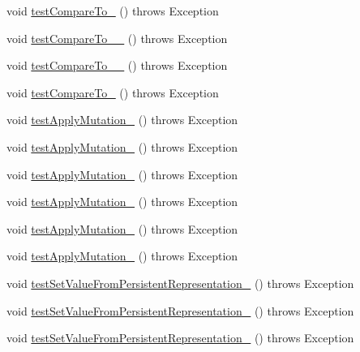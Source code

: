 \begin{DoxyCompactItemize}
void \hyperlink{classorg_1_1jgap_1_1impl_1_1_fixed_binary_gene_test_a05ec3eb8569a43c95817014098050573}{test\-Compare\-To\-\_} ()  throws Exception 
\item 
void \hyperlink{classorg_1_1jgap_1_1impl_1_1_fixed_binary_gene_test_a878445d586fbcc5c5c2ee362d26ad296}{test\-Compare\-To\-\_\-\_} ()  throws Exception 
\item 
void \hyperlink{classorg_1_1jgap_1_1impl_1_1_fixed_binary_gene_test_a255b1dd6cebe35fe1f43a2df20fcea4e}{test\-Compare\-To\-\_\-\_} ()  throws Exception 
\item 
void \hyperlink{classorg_1_1jgap_1_1impl_1_1_fixed_binary_gene_test_a88e3845b5ca58e8837e83d4be2d0c7f6}{test\-Compare\-To\-\_} ()  throws Exception 
\item 
void \hyperlink{classorg_1_1jgap_1_1impl_1_1_fixed_binary_gene_test_a792e65a343d90d0dd7c20c2edba1d9ce}{test\-Apply\-Mutation\-\_} ()  throws Exception 
\item 
void \hyperlink{classorg_1_1jgap_1_1impl_1_1_fixed_binary_gene_test_a3246d83133ca51be55191a60a4738fe4}{test\-Apply\-Mutation\-\_} ()  throws Exception 
\item 
void \hyperlink{classorg_1_1jgap_1_1impl_1_1_fixed_binary_gene_test_a7ce12014895f79baef471afd7837e7a7}{test\-Apply\-Mutation\-\_} ()  throws Exception 
\item 
void \hyperlink{classorg_1_1jgap_1_1impl_1_1_fixed_binary_gene_test_a479172af94b26a43503390a02124f4b2}{test\-Apply\-Mutation\-\_} ()  throws Exception 
\item 
void \hyperlink{classorg_1_1jgap_1_1impl_1_1_fixed_binary_gene_test_a7972abf249e5368d5bd9fcb97479ffc3}{test\-Apply\-Mutation\-\_} ()  throws Exception 
\item 
void \hyperlink{classorg_1_1jgap_1_1impl_1_1_fixed_binary_gene_test_add0c444036590ec22e43befca1bc9b58}{test\-Apply\-Mutation\-\_} ()  throws Exception 
\item 
void \hyperlink{classorg_1_1jgap_1_1impl_1_1_fixed_binary_gene_test_a46c7024c05b3fe1805ddb211a739a36f}{test\-Set\-Value\-From\-Persistent\-Representation\-\_} ()  throws Exception 
\item 
void \hyperlink{classorg_1_1jgap_1_1impl_1_1_fixed_binary_gene_test_a049c30df6fcc451ec911011d599d319c}{test\-Set\-Value\-From\-Persistent\-Representation\-\_} ()  throws Exception 
\item 
void \hyperlink{classorg_1_1jgap_1_1impl_1_1_fixed_binary_gene_test_a539a37fbdec1d1a20a3eae1542f10e2b}{test\-Set\-Value\-From\-Persistent\-Representation\-\_} ()  throws Exception 

\end{DoxyCompactItemize}

